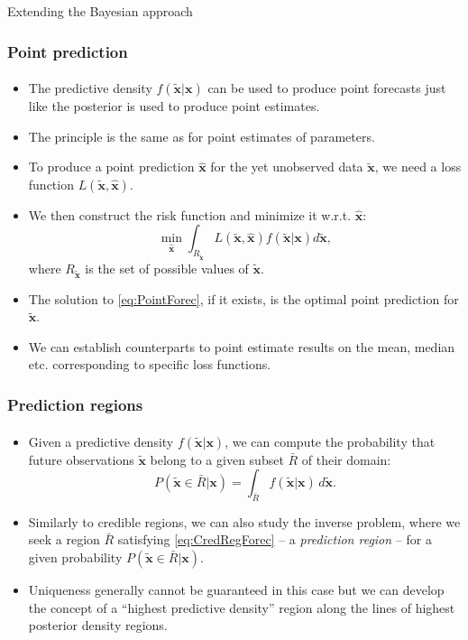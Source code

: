 \documentclass[10pt]{beamer}
\theoremstyle{definition}
\begin{document}
\begin{section}{Extending the Bayesian approach}
\begin{frame}[fragile]
\frametitle{Point prediction}
\framesubtitle{}
\begin{itemize}\itemsep1em
\item The predictive density $f(\mathbf{\tilde{x}}|\mathbf{x})$ can be used to produce point forecasts just like the posterior is used to produce point estimates.
\item The principle is the same as for point estimates of parameters.
\item To produce a point prediction $\mathbf{\hat{x}}$ for the yet unobserved data $\mathbf{\tilde{x}}$, we need a loss function $L(\mathbf{\tilde{x}},\mathbf{\hat{x}})$.
\item We then construct the risk function and minimize it w.r.t. $\mathbf{\hat{x}}$:
\begin{equation}
\label{eq:PointForec}
\min_{\mathbf{\hat{x}}}\int_{R_{\mathbf{\tilde{x}}}}L(\mathbf{\tilde{x}},\mathbf{\hat{x}})f(\mathbf{\tilde{x}}|\mathbf{x})d\mathbf{\tilde{x}},
\end{equation}
where $R_{\mathbf{\tilde{x}}}$ is the set of possible values of $\mathbf{\tilde{x}}$.
\item The solution to \eqref{eq:PointForec}, if it exists, is the optimal point prediction for $\mathbf{\tilde{x}}$.
\item We can establish counterparts to point estimate results on the mean, median etc. corresponding to specific loss functions.
\end{itemize}
\end{frame}

\begin{frame}[fragile]
\frametitle{Prediction regions}
\framesubtitle{}
\begin{itemize}\itemsep1em
\item Given a predictive density $f(\mathbf{\tilde{x}}|\mathbf{x})$, we can compute the probability that future observations $\mathbf{\tilde{x}}$ belong to a given subset $\bar{R}$ of their domain:
\begin{equation}
\label{eq:CredRegForec}
P(\mathbf{\tilde{x}}\in \bar{R}|\mathbf{x}) = \int_{\bar{R}}f(\mathbf{\tilde{x}}|\mathbf{x})\,d\mathbf{\tilde{x}}.
\end{equation}
\item Similarly to credible regions, we can also study the inverse problem, where we seek a region $\bar{R}$ satisfying \eqref{eq:CredRegForec} -- a \emph{prediction region} -- for a given probability $P(\mathbf{\tilde{x}}\in \bar{R}|\mathbf{x})$.
\item Uniqueness generally cannot be guaranteed in this case but we can develop the concept of a ``highest predictive density'' region along the lines of highest posterior density regions.
\end{itemize}
\end{frame}


\end{section}
\end{document}
